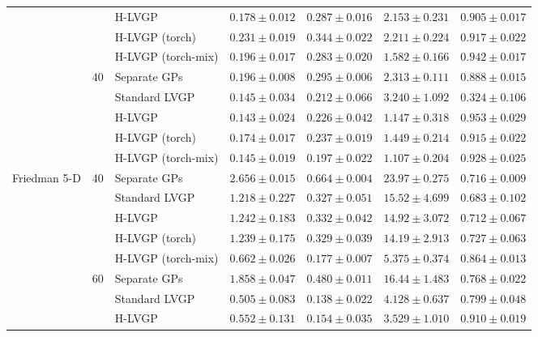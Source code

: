 \begin{table}[htbp]
\begin{tabular}{lllrrrr}
 &  & H-LVGP & $0.178 \pm 0.012$ & $0.287 \pm 0.016$ & $2.153 \pm 0.231$ & $0.905 \pm 0.017$ \\
 &  & H-LVGP (torch) & $0.231 \pm 0.019$ & $0.344 \pm 0.022$ & $2.211 \pm 0.224$ & $0.917 \pm 0.022$ \\
 &  & H-LVGP (torch-mix) & $0.196 \pm 0.017$ & $0.283 \pm 0.020$ & \colorbox{green!20}{\boldmath$1.582 \pm 0.166$} & $0.942 \pm 0.017$ \\
\cmidrule(lr){2-7}
 & \multirow{5}{*}{40} & Separate GPs & $0.196 \pm 0.008$ & $0.295 \pm 0.006$ & $2.313 \pm 0.111$ & $0.888 \pm 0.015$ \\
 &  & Standard LVGP & $0.145 \pm 0.034$ & $0.212 \pm 0.066$ & $3.240 \pm 1.092$ & $0.324 \pm 0.106$ \\
 &  & H-LVGP & \colorbox{green!20}{\boldmath$0.143 \pm 0.024$} & $0.226 \pm 0.042$ & $1.147 \pm 0.318$ & \colorbox{green!20}{\boldmath$0.953 \pm 0.029$} \\
 &  & H-LVGP (torch) & $0.174 \pm 0.017$ & $0.237 \pm 0.019$ & $1.449 \pm 0.214$ & $0.915 \pm 0.022$ \\
 &  & H-LVGP (torch-mix) & $0.145 \pm 0.019$ & \colorbox{green!20}{\boldmath$0.197 \pm 0.022$} & \colorbox{green!20}{\boldmath$1.107 \pm 0.204$} & $0.928 \pm 0.025$ \\
\midrule
\multirow{15}{*}{Friedman 5-D} & \multirow{5}{*}{40} & Separate GPs & $2.656 \pm 0.015$ & $0.664 \pm 0.004$ & $23.97 \pm 0.275$ & $0.716 \pm 0.009$ \\
 &  & Standard LVGP & $1.218 \pm 0.227$ & $0.327 \pm 0.051$ & $15.52 \pm 4.699$ & $0.683 \pm 0.102$ \\
 &  & H-LVGP & $1.242 \pm 0.183$ & $0.332 \pm 0.042$ & $14.92 \pm 3.072$ & $0.712 \pm 0.067$ \\
 &  & H-LVGP (torch) & $1.239 \pm 0.175$ & $0.329 \pm 0.039$ & $14.19 \pm 2.913$ & $0.727 \pm 0.063$ \\
 &  & H-LVGP (torch-mix) & \colorbox{green!20}{\boldmath$0.662 \pm 0.026$} & \colorbox{green!20}{\boldmath$0.177 \pm 0.007$} & \colorbox{green!20}{\boldmath$5.375 \pm 0.374$} & \colorbox{green!20}{\boldmath$0.864 \pm 0.013$} \\
\cmidrule(lr){2-7}
 & \multirow{5}{*}{60} & Separate GPs & $1.858 \pm 0.047$ & $0.480 \pm 0.011$ & $16.44 \pm 1.483$ & $0.768 \pm 0.022$ \\
 &  & Standard LVGP & $0.505 \pm 0.083$ & $0.138 \pm 0.022$ & $4.128 \pm 0.637$ & $0.799 \pm 0.048$ \\
 &  & H-LVGP & $0.552 \pm 0.131$ & $0.154 \pm 0.035$ & $3.529 \pm 1.010$ & $0.910 \pm 0.019$ \\

\end{tabular}
\end{table}
